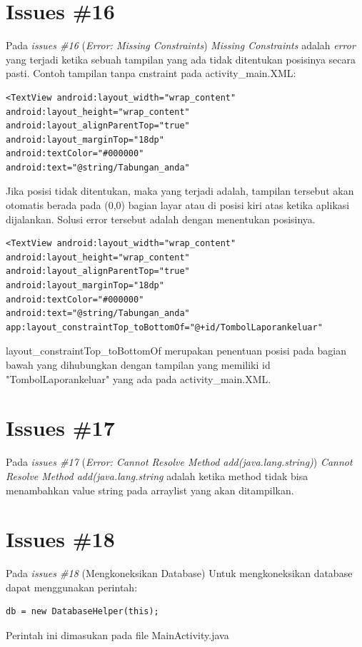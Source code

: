 \section{Issues \#16}
Pada \textit{issues \#16} (\textit{Error: Missing Constraints}) \textit{Missing Constraints} adalah \textit{error} yang terjadi ketika sebuah tampilan yang ada tidak ditentukan posisinya secara pasti. Contoh tampilan tanpa cnstraint pada activity\_main.XML: 
\begin{verbatim}
<TextView android:layout_width="wrap_content"
android:layout_height="wrap_content"
android:layout_alignParentTop="true"
android:layout_marginTop="18dp"
android:textColor="#000000"
android:text="@string/Tabungan_anda" 
\end{verbatim}
Jika posisi tidak ditentukan, maka yang terjadi adalah, tampilan tersebut akan otomatis berada pada (0,0) bagian layar atau di posisi kiri atas ketika aplikasi dijalankan. Solusi error tersebut adalah dengan menentukan posisinya. 
\begin{verbatim}
<TextView android:layout_width="wrap_content"
android:layout_height="wrap_content"
android:layout_alignParentTop="true"
android:layout_marginTop="18dp"
android:textColor="#000000"
android:text="@string/Tabungan_anda"
app:layout_constraintTop_toBottomOf="@+id/TombolLaporankeluar"
\end{verbatim}
layout\_constraintTop\_toBottomOf merupakan penentuan posisi pada bagian bawah yang dihubungkan dengan tampilan yang memiliki id "TombolLaporankeluar" yang ada pada activity\_main.XML.


\section{Issues \#17}
Pada \textit{issues \#17} (\textit{Error: Cannot Resolve Method add(java.lang.string)}) \textit{Cannot Resolve Method add(java.lang.string} adalah ketika method tidak bisa menambahkan value string pada arraylist yang akan ditampilkan. 

\section{Issues \#18}
Pada \textit{issues \#18} (Mengkoneksikan Database) Untuk mengkoneksikan database dapat menggunakan perintah:
\begin{verbatim}
db = new DatabaseHelper(this); 
\end{verbatim}
Perintah ini dimasukan pada file MainActivity.java


